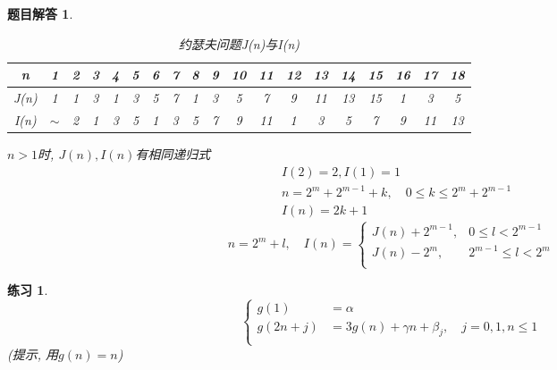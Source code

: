 \documentclass[mode=geye, chinesefont=founder]{elegantnote}
\newtheorem{exercise}{练习}
\newtheorem{answer}{题目解答}
\begin{document}
\begin{answer}
	\begin{table}[htbp]
		\centering
		\small
		\caption{约瑟夫问题J(n)与I(n)}
		\begin{tabular}{c|c cc cccc cccccccc ccc}
			\toprule
			n 
			& 1 
			& 2 & 3 
			& 4 & 5 & 6 & 7 
			& 8 & 9 & 10 & 11 & 12 & 13 & 14 & 15 
			& 16 & 17 & 18 \\
			\midrule
			J(n) 
			& 1 
			& 1 & 3 
			& 1 & 3 & 5 & 7 
			& 1 & 3	& 5 & 7 & 9 & 11 & 13 & 15
			& 1 & 3 & 5 \\
			\midrule
			I(n) 
			& $\sim$ 
			& 2  
			& 1 & 3 & 5  
			& 1 & 3	& 5 & 7 & 9 & 11 
			& 1 & 3	& 5 & 7 & 9 & 11 &13 \\
			\bottomrule
		\end{tabular}%
		\label{tab:JNIN}%
	\end{table}%

$ n >1 $时,  $ J(n), I(n) $有相同递归式
\begin{align*}
	& I(2) = 2, I(1) = 1\\
	& n=2^m + 2^{m-1}+k, \quad 0\leqslant k \leqslant 2^m + 2^{m-1}\\
	& I(n) = 2k+1 
\end{align*}
\begin{equation*}
	n = 2^m + l ,\quad I(n) =
	\left\{
	\begin{array}{ll}
		J(n)+2^{m-1}, 	& 0 		\leqslant l < 2^{m-1} 	\\
		J(n)-2^{m}, 	& 2^{m-1}	\leqslant l < 2^{m} 	\\
	\end{array}
	\right.
\end{equation*}
\end{answer}

\begin{exercise}
	\begin{equation*}
		\left\{
		\begin{array}{rl}
			g(1) 	&= \alpha	\\
			g(2n+j)	&= 3g(n)+\gamma n + \beta_j, \quad j=0,1, n\leqslant 1\\
		\end{array}
		\right.
	\end{equation*}
(提示, 用$ g(n)=n $)
\end{exercise}
\end{document}
